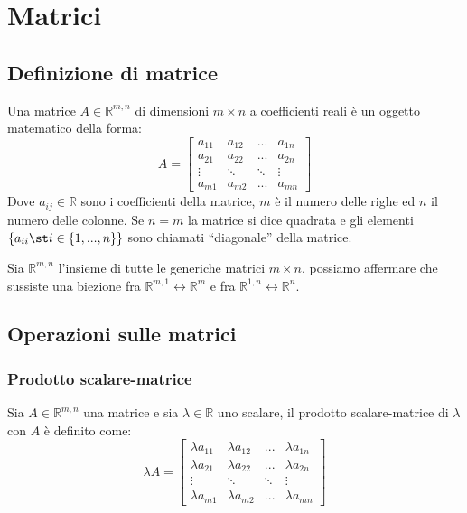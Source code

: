 
\section{Matrici} \label{sec:matrices}
\subsection{Definizione di matrice} \label{subsec:matdefinition}
    Una matrice $A \in \mathbb{R}^{m, n}$ di dimensioni $m \times n$ a coefficienti reali è un oggetto matematico della forma:
    \[  A =
        \begin{bmatrix}
            a_{11} & a_{12} & ... & a_{1n} \\
            a_{21} & a_{22} & ... & a_{2n} \\
            \vdots & \ddots & \ddots & \vdots \\
            a_{m1} & a_{m2} & ... & a_{mn}
        \end{bmatrix}
    \]
    Dove $a_{ij} \in \mathbb{R}$ sono i coefficienti della matrice, $m$ è il numero delle righe ed $n$ il numero delle colonne.
    Se $n = m$ la matrice si dice quadrata e gli elementi $\{ a_{ii} \st i \in \{1, ..., n\}\}$ sono chiamati ``diagonale'' della matrice.

    \vspace{10pt}
    Sia $\mathbb{R}^{m, n}$ l'insieme di tutte le generiche matrici $m \times n$, possiamo affermare che sussiste una biezione fra $\mathbb{R}^{m, 1} \leftrightarrow \mathbb{R}^{m}$ e fra $\mathbb{R}^{1, n} \leftrightarrow \mathbb{R}^{n}$.



\subsection{Operazioni sulle matrici}
\subsubsection{Prodotto scalare-matrice} \label{subsec:matscalarmul}
    Sia $A \in \mathbb{R}^{m, n}$ una matrice e sia $\lambda \in \mathbb{R}$ uno scalare, il prodotto scalare-matrice di $\lambda$ con $A$ è definito come:
    \[
    \lambda A =
    \begin{bmatrix}
        \lambda a_{11} & \lambda a_{12} & ... & \lambda a_{1n} \\
        \lambda a_{21} & \lambda a_{22} & ... & \lambda a_{2n} \\
        \vdots & \ddots & \ddots & \vdots \\
        \lambda a_{m1} & \lambda a_{m2} & ... & \lambda a_{mn}
    \end{bmatrix}
    \]

